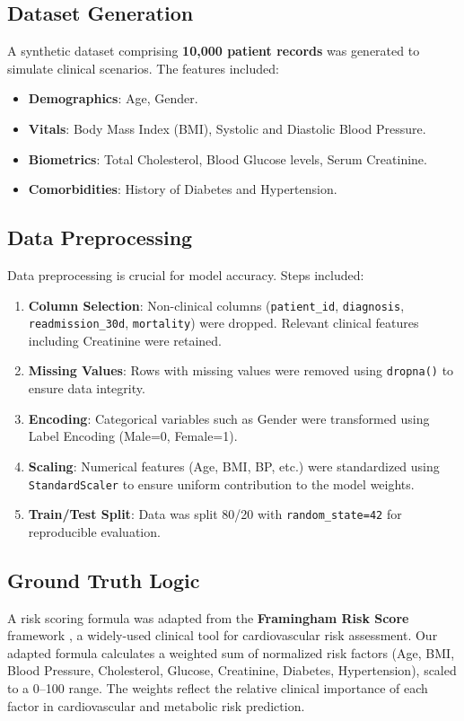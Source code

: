 \documentclass[12pt, a4paper]{article}
\begin{document}
\subsection{Dataset Generation}
A synthetic dataset comprising \textbf{10,000 patient records} was generated to simulate clinical scenarios. The features included:
\begin{itemize}
    \item \textbf{Demographics}: Age, Gender.
    \item \textbf{Vitals}: Body Mass Index (BMI), Systolic and Diastolic Blood Pressure.
    \item \textbf{Biometrics}: Total Cholesterol, Blood Glucose levels, Serum Creatinine.
    \item \textbf{Comorbidities}: History of Diabetes and Hypertension.
\end{itemize}

\subsection{Data Preprocessing}
Data preprocessing is crucial for model accuracy. Steps included:
\begin{enumerate}
    \item \textbf{Column Selection}: Non-clinical columns (\texttt{patient\_id}, \texttt{diagnosis}, \texttt{readmission\_30d}, \texttt{mortality}) were dropped. Relevant clinical features including Creatinine were retained.
    \item \textbf{Missing Values}: Rows with missing values were removed using \texttt{dropna()} to ensure data integrity.
    \item \textbf{Encoding}: Categorical variables such as Gender were transformed using Label Encoding (Male=0, Female=1).
    \item \textbf{Scaling}: Numerical features (Age, BMI, BP, etc.) were standardized using \texttt{StandardScaler} to ensure uniform contribution to the model weights.
    \item \textbf{Train/Test Split}: Data was split 80/20 with \texttt{random\_state=42} for reproducible evaluation.
\end{enumerate}

\subsection{Ground Truth Logic}
A risk scoring formula was adapted from the \textbf{Framingham Risk Score} framework \cite{framingham}, a widely-used clinical tool for cardiovascular risk assessment. Our adapted formula calculates a weighted sum of normalized risk factors (Age, BMI, Blood Pressure, Cholesterol, Glucose, Creatinine, Diabetes, Hypertension), scaled to a 0--100 range. The weights reflect the relative clinical importance of each factor in cardiovascular and metabolic risk prediction.
\end{document}
